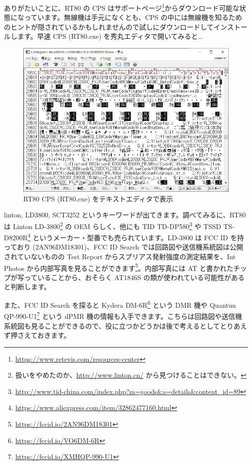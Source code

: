 \documentclass[a4j,oneside]{ujbook}
\begin{document}
ありがたいことに、RT80 の CPS はサポートページ\footnote{\url{https://www.retevis.com/resources-center}}からダウンロード可能な状態になっています。無線機は手元になくとも、CPS の中には無線機を知るためのヒントが隠されているかもしれませんので試しにダウンロードしてインストールします。早速 CPS (RT80.exe) を秀丸エディタで開いてみると…

\begin{figure}[H]
 \centering
 \includegraphics[width=15cm]{img/rt80-cps.png}
 \caption{RT80 CPS (RT80.exe) をテキストエディタで表示}
\end{figure}

linton, LD3800, SCT3252 というキーワードが出てきます。調べてみるに、RT80 は Linton LD-3800\footnote{扱いをやめたのか、\url{http://www.linton.cn/} から見つけることはできない。} の OEM らしく、他にも TID TD-DP580\footnote{\url{http://www.tid-china.com/index.php?m=goods&a=details&content_id=89}} や TSSD TS-D8200R\footnote{\url{https://www.aliexpress.com/item/32862477160.html}} というメーカー・型番でも売られています。LD-3800 は FCC ID を持っており (2AN96DM18301)、FCC ID Search では回路図や送信機系統図は公開されていないものの Test Report からスプリアス発射強度の測定結果を、Int Photos から内部写真を見ることができます\footnote{\url{https://fccid.io/2AN96DM18301}}。内部写真には AT と書かれたチップが写っていることから、おそらく AT1846S の類が使われている可能性があると判断します。

また、FCC ID Search を探ると Kydera DM-6R\footnote{\url{https://fccid.io/VO6DM-6R}} という DMR 機や Quantun QP-990-U1\footnote{\url{https://fccid.io/XMHQP-990-U1}} という dPMR 機の情報も入手できます。こちらは回路図や送信機系統図も見ることができるので、役に立つかどうかは後で考えるとしてとりあえず押さえておきます。
\end{document}
